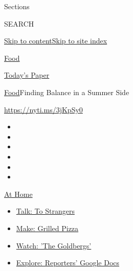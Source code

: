 Sections

SEARCH

\protect\hyperlink{site-content}{Skip to
content}\protect\hyperlink{site-index}{Skip to site index}

\href{https://www.nytimes3xbfgragh.onion/section/food}{Food}

\href{https://myaccount.nytimes3xbfgragh.onion/auth/login?response_type=cookie\&client_id=vi}{}

\href{https://www.nytimes3xbfgragh.onion/section/todayspaper}{Today's
Paper}

\href{/section/food}{Food}\textbar{}Finding Balance in a Summer Side

\url{https://nyti.ms/3jKpSy0}

\begin{itemize}
\item
\item
\item
\item
\item
\item
\end{itemize}

\href{https://www.nytimes3xbfgragh.onion/spotlight/at-home?action=click\&pgtype=Article\&state=default\&region=TOP_BANNER\&context=at_home_menu}{At
Home}

\begin{itemize}
\tightlist
\item
  \href{https://www.nytimes3xbfgragh.onion/2020/08/03/well/family/the-benefits-of-talking-to-strangers.html?action=click\&pgtype=Article\&state=default\&region=TOP_BANNER\&context=at_home_menu}{Talk:
  To Strangers}
\item
  \href{https://www.nytimes3xbfgragh.onion/2020/08/01/at-home/coronavirus-make-pizza-on-a-grill.html?action=click\&pgtype=Article\&state=default\&region=TOP_BANNER\&context=at_home_menu}{Make:
  Grilled Pizza}
\item
  \href{https://www.nytimes3xbfgragh.onion/2020/07/31/arts/television/goldbergs-abc-stream.html?action=click\&pgtype=Article\&state=default\&region=TOP_BANNER\&context=at_home_menu}{Watch:
  'The Goldbergs'}
\item
  \href{https://www.nytimes3xbfgragh.onion/interactive/2020/at-home/even-more-reporters-editors-diaries-lists-recommendations.html?action=click\&pgtype=Article\&state=default\&region=TOP_BANNER\&context=at_home_menu}{Explore:
  Reporters' Google Docs}
\end{itemize}

